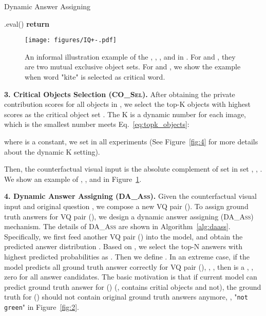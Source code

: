 \documentclass[10pt,twocolumn,letterpaper]{article}
\begin{document}
\begin{algorithm}[tbp]
	\caption{Dynamic Answer Assigning}\label{alg:daass}
	\begin{algorithmic}[1]
		\Function {}{}
		\State	.eval() 
		\State  
		\State 
		\State  {}
		\State \textbf{return} 
		\EndFunction
	\end{algorithmic}
\end{algorithm}

\begin{figure}[tbp]
	\centering
	\texttt{[image: figures/IQ+-.pdf]}
	\vspace{-0.5em}
	\caption{An informal illustration example of the , , , and  in . For  and , they are two mutual exclusive object sets. For  and , we show the example when word "kite" is selected as critical word.
	}
	\label{fig:3}
\end{figure}


\textbf{3. Critical Objects Selection (\textsc{CO\_Sel}).} After obtaining the private contribution scores  for all objects in , we select the top-K objects with highest scores as the critical object set . The K is a dynamic number for each image, which is the smallest number meets Eq.~\eqref{eq:topk_objects}:

where  is a constant, we set  in all experiments (See Figure~\ref{fig:4} for more details about the dynamic K setting).

Then, the counterfactual visual input  is the absolute complement of set  in set , \ie, . We show an example of , , and  in Figure~\ref{fig:3}.


\textbf{4. Dynamic Answer Assigning (\textsc{DA\_Ass}).} Given the counterfactual visual input  and original question , we compose a new VQ pair (). To assign ground truth answers for VQ pair  (), we design a dynamic answer assigning (\textsc{DA\_Ass}) mechanism. The details of \textsc{DA\_Ass} are shown in Algorithm~\ref{alg:daass}. Specifically, we first feed another VQ pair () into the  model, and obtain the predicted answer distribution . Based on , we select the top-N answers with highest predicted probabilities as . Then we define . In an extreme case, if the model predicts all ground truth answer correctly for VQ pair (), \ie, , then  is a , \ie, zero for all answer candidates. The basic motivation is that if current model can predict ground truth answer for () (\ie,  contains critial objects and  not), the ground truth for () should not contain original ground truth answers anymore, \eg, "\texttt{not green}" in Figure~\ref{fig:2}.
\end{document}
